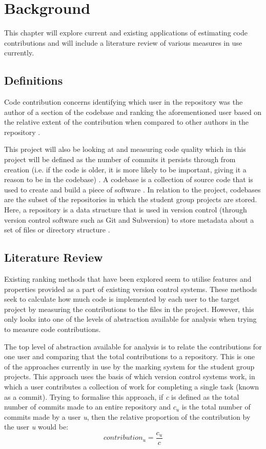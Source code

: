 \chapter{Background}
This chapter will explore current and existing applications of estimating code contributions and will include a literature review of various measures in use currently.
\section{Definitions}
Code contribution concerns identifying which user in the repository was the author of a section of the codebase and ranking the aforementioned user based on the relative extent of the contribution when compared to other authors in the repository \citep{10.1007/s10664-017-9575-4}.

This project will also be looking at and measuring code quality which in this project will be defined as the number of commits it persists through from creation (i.e. if the code is older, it is more likely to be important, giving it a reason to be in the codebase) \citep{10.1093/iwc/iwx010}. A codebase is a collection of source code that is used to create and build a piece of software \citep{wiki:codebase}. In relation to the project, codebases are the subset of the repositories in which the student group projects are stored. Here, a repository is a data structure that is used in version control (through version control software such as Git and Subversion) to store metadata about a set of files or directory structure \cite{collins-sussman_fitzpatrick_pilato_2004}.

\section{Literature Review}
Existing ranking methods that have been explored seem to utilise features and properties provided as a part of existing version control systems. These methods seek to calculate how much code is implemented by each user to the target project by measuring the contributions to the files in the project. However, this only looks into one of the levels of abstraction available for analysis when trying to measure code contributions.

The top level of abstraction available for analysis is to relate the contributions for one user and comparing that the total contributions to a repository. This is one of the approaches currently in use by the marking system for the student group projects. This approach uses the basis of which version control systems work, in which a user contributes a collection of work for completing a single task (known as a commit). Trying to formalise this approach, if \textit{c} is defined as the total number of commits made to an entire repository and \textit{$c_u$} is the total number of commits made by a user \textit{u}, then the relative proportion of the contribution by the user \textit{u} would be: 
\begin{equation} \label{eq:1}
  contribution_u = \frac{c_u}{c}
\end{equation}

